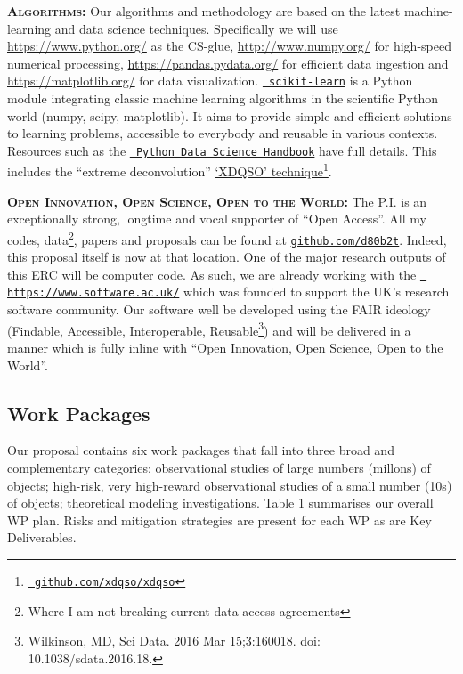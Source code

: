 \smallskip
\smallskip
\noindent
\textbf{\textsc{Algorithms: }}
Our algorithms and methodology are based on the latest
machine-learning and data science
techniques. Specifically we will use 
\href{Python}{https://www.python.org/} as the CS-glue, 
\href{NumPy}{http://www.numpy.org/} for high-speed numerical processing, 
\href{pandas}{https://pandas.pydata.org/} for efficient data ingestion and 
\href{Matplotlib}{https://matplotlib.org/} for data visualization. 
\href{http://ogrisel.github.io/scikit-learn.org/sklearn-tutorial/index.html}{\tt
scikit-learn} is a Python module integrating classic machine learning
algorithms in the scientific Python world (numpy, scipy,
matplotlib). It aims to provide simple and efficient solutions to
learning problems, accessible to everybody and reusable in various
contexts. Resources such as the
\href{https://github.com/jakevdp/PythonDataScienceHandbook}{{\tt
Python Data Science Handbook}} have full details. This includes the
``extreme deconvolution''
\href{http://www.sdss.org/dr14/data\_access/value-added-catalogs/?vac\_id=xdqso/}{`XDQSO'
technique}\footnote{\href{https://github.com/xdqso/xdqso}{\tt
github.com/xdqso/xdqso}}.



\smallskip
\smallskip
\noindent
\textbf{\textsc{Open Innovation, Open Science, Open to the World:}} 
The P.I. is an exceptionally strong, longtime and vocal supporter of
``Open Access''.  All my codes, data\footnote{Where I am not breaking
current data access agreements}, papers and proposals can be found at
\href{github.com/d80b2t}{{\tt github.com/d80b2t}}.  Indeed, this
proposal itself is now at that location.  One of the major research
outputs of this ERC will be computer code.  As such, we are already
working with the \href{The Software Sustainability Institute}{\tt
https://www.software.ac.uk/} which was founded to support the UK's
research software community.  Our software well be developed using the
FAIR ideology (Findable, Accessible, Interoperable,
Reusable\footnote{Wilkinson, MD, Sci Data. 2016 Mar 15;3:160018. doi:
10.1038/sdata.2016.18.})  and will be delivered in a manner which is
fully inline with ``Open Innovation, Open Science, Open to the
World''.



\subsection{Work Packages}
\smallskip 
\smallskip
\noindent
Our proposal contains six work packages that fall into three broad
and complementary categories: observational studies of large numbers
(millons) of objects; high-risk, very high-reward observational
studies of a small number (10s) of objects; theoretical modeling
investigations. Table 1 summarises our overall WP plan. Risks and
mitigation strategies are present for each WP as are Key Deliverables.

